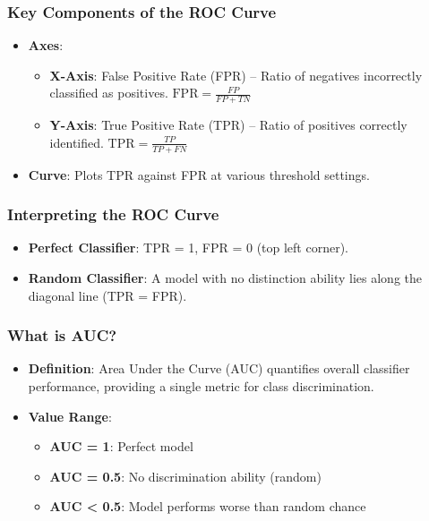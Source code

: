 \documentclass[aspectratio=169]{beamer}
\begin{document}
\begin{frame}[fragile]
    \frametitle{Key Components of the ROC Curve}
    \begin{itemize}
        \item \textbf{Axes}:
        \begin{itemize}
            \item \textbf{X-Axis}: False Positive Rate (FPR) – Ratio of negatives incorrectly classified as positives. \(\text{FPR} = \frac{FP}{FP + TN}\)
            \item \textbf{Y-Axis}: True Positive Rate (TPR) – Ratio of positives correctly identified. \(\text{TPR} = \frac{TP}{TP + FN}\)
        \end{itemize}
        \item \textbf{Curve}: Plots TPR against FPR at various threshold settings.
    \end{itemize}
\end{frame}

\begin{frame}[fragile]
    \frametitle{Interpreting the ROC Curve}
    \begin{itemize}
        \item \textbf{Perfect Classifier}: TPR = 1, FPR = 0 (top left corner).
        \item \textbf{Random Classifier}: A model with no distinction ability lies along the diagonal line (TPR = FPR).
    \end{itemize}
\end{frame}

\begin{frame}[fragile]
    \frametitle{What is AUC?}
    \begin{itemize}
        \item \textbf{Definition}: Area Under the Curve (AUC) quantifies overall classifier performance, providing a single metric for class discrimination.
        \item \textbf{Value Range}:
        \begin{itemize}
            \item \textbf{AUC = 1}: Perfect model
            \item \textbf{AUC = 0.5}: No discrimination ability (random)
            \item \textbf{AUC < 0.5}: Model performs worse than random chance
        \end{itemize}
    \end{itemize}
\end{frame}
\end{document}
